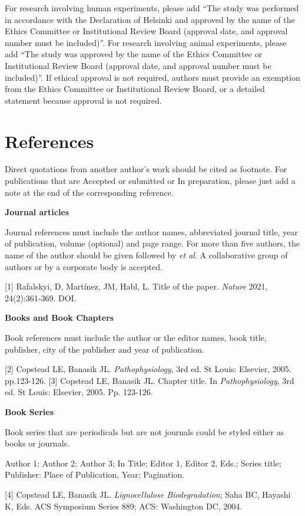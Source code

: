 \documentclass{ELSP}
\begin{document}
For research involving human experiments, please add “The study was performed in accordance with the Declaration of Helsinki and approved by the name of the Ethics Committee or Institutional Review Board (approval date, and approval number must be included)”.
For research involving animal experiments, please add “The study was approved by the name of the Ethics Committee or Institutional Review Board (approval date, and approval number must be included)”.
If ethical approval is not required, authors must provide an exemption from the Ethics Committee or Institutional Review Board, or a detailed statement because approval is not required.


\section*{References}
Direct quotations from another author's work should be cited as
footnote. For publications that are Accepted or submitted or In
preparation, please just add a note at the end of the corresponding
reference.
\setlength{\parindent}{0em}


\textbf{Journal articles}

Journal references must include the author names, abbreviated journal
title, year of publication, volume (optional) and page range. For more
than five authors, the name of the author should be given followed by
\textit{et al}. A collaborative group of authors or by a corporate body is
accepted.

{[}1{]} Rafalskyi, D, Martínez, JM, Habl, L. Title of the paper. \textit{Nature} 2021, 24(2):361‐369. DOI.

\textbf{Books and Book Chapters}

Book references must include the author or the editor names, book title,
publisher, city of the publisher and year of publication.


{[}2{]} Copstead LE, Banasik JL. \textit{Pathophysiology}, 3rd ed. St Louis: Elsevier, 2005. pp.123-126.
{[}3{]} Copstead LE, Banasik JL. Chapter title. In	\textit{Pathophysiology}, 3rd ed. St Louis: Elsevier, 2005. Pp. 123-126.

\textbf{Book Series}

Book series that are periodicals but are not journals could be styled
either as books or journals.

Author 1; Author 2; Author 3; In Title; Editor 1, Editor 2, Eds.; Series
title; Publisher: Place of Publication, Year; Pagination.

{[}4{]} Copstead LE, Banasik JL. \textit{Lignocellulose Biodegradation};
	Saha BC, Hayashi K, Eds. ACS Symposium Series 889; ACS: Washington DC,
	2004.
\end{document}
